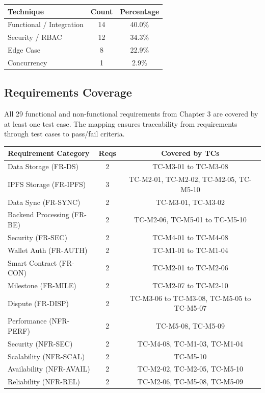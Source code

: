 \documentclass[12pt,a4paper]{article}
\begin{document}
\begin{tabular}{lcc}
\toprule
\textbf{Technique} & \textbf{Count} & \textbf{Percentage} \\
\midrule
Functional / Integration & 14 & 40.0\% \\
Security / RBAC          & 12 & 34.3\% \\
Edge Case                &  8 & 22.9\% \\
Concurrency             &  1 &  2.9\% \\
\bottomrule
\end{tabular}

\vspace{0.5cm}

\subsection{Requirements Coverage}

All 29 functional and non-functional requirements from Chapter 3 are covered by at least one test case. The mapping ensures traceability from requirements through test cases to pass/fail criteria.

\begin{tabular}{lcc}
\toprule
\textbf{Requirement Category} & \textbf{Reqs} & \textbf{Covered by TCs} \\
\midrule
Data Storage (FR-DS)         & 2  & TC-M3-01 to TC-M3-08 \\
IPFS Storage (FR-IPFS)       & 3  & TC-M2-01, TC-M2-02, TC-M2-05, TC-M5-10 \\
Data Sync (FR-SYNC)          & 2  & TC-M3-01, TC-M3-02 \\
Backend Processing (FR-BE)   & 2  & TC-M2-06, TC-M5-01 to TC-M5-10 \\
Security (FR-SEC)            & 2  & TC-M4-01 to TC-M4-08 \\
Wallet Auth (FR-AUTH)        & 2  & TC-M1-01 to TC-M1-04 \\
Smart Contract (FR-CON)      & 2  & TC-M2-01 to TC-M2-06 \\
Milestone (FR-MILE)          & 2  & TC-M2-07 to TC-M2-10 \\
Dispute (FR-DISP)            & 2  & TC-M3-06 to TC-M3-08, TC-M5-05 to TC-M5-07 \\
Performance (NFR-PERF)       & 2  & TC-M5-08, TC-M5-09 \\
Security (NFR-SEC)           & 2  & TC-M4-08, TC-M1-03, TC-M1-04 \\
Scalability (NFR-SCAL)       & 2  & TC-M5-10 \\
Availability (NFR-AVAIL)     & 2  & TC-M2-02, TC-M2-05, TC-M5-10 \\
Reliability (NFR-REL)        & 2  & TC-M2-06, TC-M5-08, TC-M5-09 \\
\bottomrule
\end{tabular}
\end{document}
